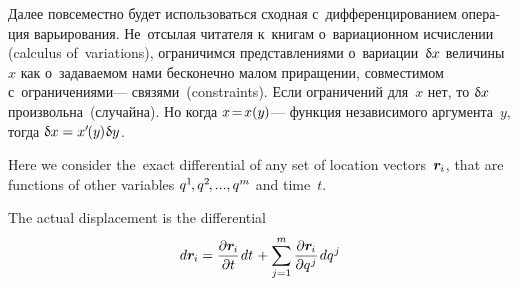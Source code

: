 

\label{para:calculusofvariations}

\begin{otherlanguage}{russian}

Далее повсеместно будет использоваться сходная с~дифференцированием операция варьирования.
Не~отсылая читателя к~книгам о~вариационном исчислении (calculus of~variations), ограничимся представлениями о~вариации~${\updelta\hspace{-0.1ex}x}$ величины~$x$ как о~задаваемом нами бесконечно малом приращении, совместимом с~ограничениями\:--- связями~(constraints).
Если ограничений для~$x$ нет, то ${\updelta\hspace{-0.1ex}x}$ произвольна~(случайна).
Но когда ${x \!=\! x(y\hspace{-0.1ex})}$\:--- функция независимого аргумента~$y$, тогда ${\updelta\hspace{-0.1ex}x = x'\hspace{-0.25ex}(y\hspace{-0.1ex}) \hspace{.1ex} \updelta\hspace{-0.1ex}y}$.



{\small
\setlength{\abovedisplayskip}{2pt}\setlength{\belowdisplayskip}{2pt}

Here we consider the~exact differential of any set of location vectors~${\bm{r}_{\hspace{-0.1ex}i}}$, that are functions of other variables ${q^{1} \hspace{-0.25ex}, q^{2} \hspace{-0.25ex}, ..., q^{m}}$ and time~$t$.

The actual displacement is the differential
\[\displaystyle d\bm{r}_{\hspace{-0.1ex}i} = \frac{\partial \bm{r}_{\hspace{-0.1ex}i}}{\partial t} \hspace{.16ex} dt \hspace{.2ex} + \sum_{j=1}^{m} {\frac{\partial \bm{r}_{\hspace{-0.1ex}i}}{\partial q^{\hspace{.1ex}j}}} \hspace{.2ex} dq^{\hspace{.1ex}j}\]

}
\end{otherlanguage}
